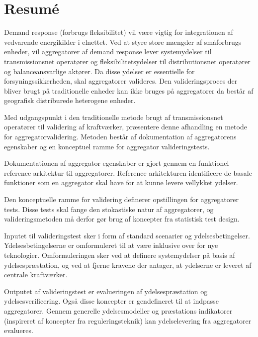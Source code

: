 \chapter{Resum\'e}
Demand response (forbrugs fleksibilitet) vil være vigtig for integrationen af vedvarende energikilder i elnettet. Ved at styre store mængder af småforbrugs enheder, vil aggregatorer af demand response lever systemydelser til transmissionsnet operatører og fleksibilitetsydelser til distributionsnet operatører og balanceansvarlige aktører. Da disse ydelser er essentielle for forsyningssikkerheden, skal aggregatorer valideres. Den valideringsproces der bliver brugt på traditionelle enheder kan ikke bruges på aggregatorer da består af geografisk distriburede heterogene enheder.

Med udgangspunkt i den traditionelle metode brugt af transmissionsnet operatører til validering af kraftværker, præsentere denne afhandling en metode for aggregatorvalidering. Metoden består af dokumentation af aggregatorens egenskaber og en konceptuel ramme for aggregator valideringstests.

Dokumentationen af aggregator egenskaber er gjort gennem en funktionel reference arkitektur til aggregatorer. Reference arkitekturen identificere de basale funktioner som en aggregator skal have for at kunne levere vellykket ydelser.

Den konceptuelle ramme for validering definerer opstillingen for aggregatorer tests. Disse tests skal fange den stokastiske natur af aggregatorer, og valideringsmetoden må derfor gør brug af koncepter fra statistisk test design.

Inputet til valideringstest sker i form af standard scenarier og ydelsesbetingelser. Ydelsesbetingelserne er omformuleret til at være inklusive over for nye teknologier. Omformuleringen sker ved at definere systemydelser på basis af ydelsespræstation, og ved at fjerne kravene der antager, at ydelserne er leveret af centrale kraftværker.

Outputet af valideringstest er evalueringen af ydelsespræstation og ydelsesverificering. Også disse koncepter er gendefineret til at indpasse aggregatorer. Gennem generelle ydelsesmodeller og præstations indikatorer (inspireret af koncepter fra reguleringsteknik) kan ydelselevering fra aggregatorer evalueres.
